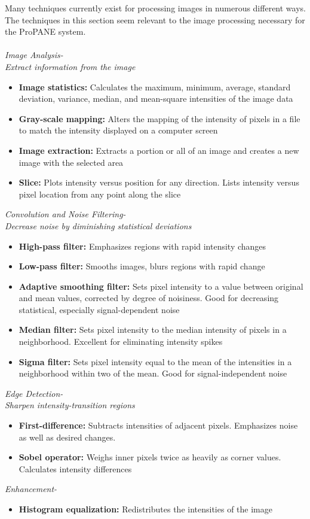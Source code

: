 \documentclass[]{article}
\begin{document}
\noindent Many techniques currently exist for processing images in numerous different ways.  The techniques in this section seem relevant to the image processing necessary for the ProPANE system. \cite{ndt} \\ \\
{\sl Image Analysis- \\ \indent Extract information from the image} 
			\begin{itemize} 
				\item{\textbf{Image statistics:}} Calculates the maximum, minimum, average, standard deviation, variance, median, and mean-square intensities of the image data					
				\item{\textbf{Gray-scale mapping:}} Alters the mapping of the intensity of pixels in a file to match the intensity displayed on a computer screen 
				\item{\textbf{Image extraction:}} Extracts a portion or all of an image and creates a new image with the selected area 
				\item{\textbf{Slice:}} Plots intensity versus position for any direction. Lists intensity versus pixel location from any point along the slice
			\end{itemize} 
{\sl Convolution and Noise Filtering- \\ \indent Decrease noise by diminishing statistical deviations}
			\begin{itemize}
				\item{\textbf{High-pass filter:}} Emphasizes regions with rapid intensity changes
				\item{\textbf{Low-pass filter:}} Smooths images, blurs regions with rapid change
				\item{\textbf{Adaptive smoothing filter:}} Sets pixel intensity to a value between original and mean values, corrected by degree of noisiness. Good for decreasing statistical, especially signal-dependent noise
				\item{\textbf{Median filter:}} Sets pixel intensity to the median intensity of pixels in a neighborhood. Excellent for eliminating intensity spikes
				\item{\textbf{Sigma filter:}} Sets pixel intensity equal to the mean of the intensities in a neighborhood within two of the mean.  Good for signal-independent noise
			\end{itemize}
{\sl Edge Detection- \\ \indent Sharpen intensity-transition regions}	
			\begin{itemize}
				\item{\textbf{First-difference:}} Subtracts intensities of adjacent pixels.  Emphasizes noise as well as desired changes. 
				\item{\textbf{Sobel operator:}} Weighs inner pixels twice as heavily as corner values.  Calculates intensity differences
			\end{itemize}
{\sl Enhancement- }
			\begin{itemize}
				\item{\textbf{Histogram equalization:}} Redistributes the intensities of the image
			\end{itemize}
\end{document}
